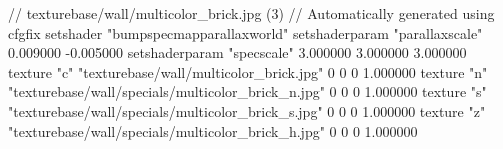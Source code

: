 // texturebase/wall/multicolor_brick.jpg (3)
// Automatically generated using cfgfix
setshader "bumpspecmapparallaxworld"
setshaderparam "parallaxscale" 0.009000 -0.005000
setshaderparam "specscale" 3.000000 3.000000 3.000000
texture "c" "texturebase/wall/multicolor_brick.jpg" 0 0 0 1.000000
texture "n" "texturebase/wall/specials/multicolor_brick_n.jpg" 0 0 0 1.000000
texture "s" "texturebase/wall/specials/multicolor_brick_s.jpg" 0 0 0 1.000000
texture "z" "texturebase/wall/specials/multicolor_brick_h.jpg" 0 0 0 1.000000
